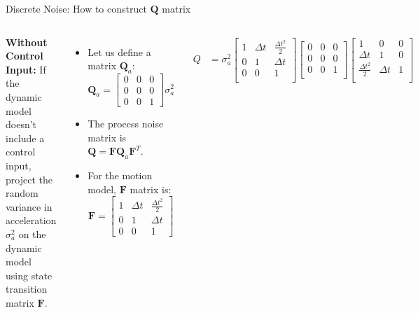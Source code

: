 \begin{frame}{Discrete Noise: How to construct  $\mathbf{Q}$ matrix}
\label{DiscreteNoise_ConstructQMatrix}
\begin{columns}
    \textbf{Without Control Input:}
    If the dynamic model doesn’t include a control input,  project the random variance in acceleration $\sigma_a^2$ on the dynamic model using state transition matrix $\mathbf{F}$.
    \begin{itemize}
        \item Let us define a matrix $\mathbf{Q}_a$:
        \[ \mathbf{Q}_a = \begin{bmatrix} 0 & 0 & 0 \\ 0 & 0 & 0 \\ 0 & 0 & 1 \end{bmatrix} \sigma_a^2 \]
        \item The process noise matrix is $\mathbf{Q} = \mathbf{F}\mathbf{Q}_a\mathbf{F}^T$.
        \item For the motion model, $\mathbf{F}$ matrix is:
        \vspace{-10pt}
        \[ \mathbf{F} = \begin{bmatrix} 1 & \Delta t  & \frac{\Delta t^2} {2}\\ 0 & 1 & \Delta t \\ 0 & 0 & 1 \end{bmatrix} \]
    \end{itemize}
    \vspace{-10pt}
    \begin{align*}
    Q \!& =\! \sigma_a^2 \!
    \begin{bmatrix}
    1 & \Delta t & \frac{\Delta t^2}{2} \\
    0 & 1 & \Delta t \\
    0 & 0 & 1 \\
    \end{bmatrix}\!\!\!
    \begin{bmatrix}
    0 & 0 & 0 \\
    0 & 0 & 0 \\
    0 & 0 & 1 \\
    \end{bmatrix}\!\!\!
    \begin{bmatrix}
    1 & 0 & 0 \\
    \Delta t & 1 & 0 \\
    \frac{\Delta t^2}{2} & \Delta t & 1 \\
    \end{bmatrix}\\

\end{align*}
\end{columns}
\end{frame}
